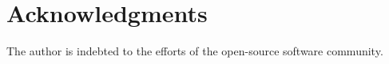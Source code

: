 \documentclass[12pt,a4paper]{article}
\begin{document}
\section*{Acknowledgments}
The author is indebted to the efforts of the open-source software community.



\end{document}
